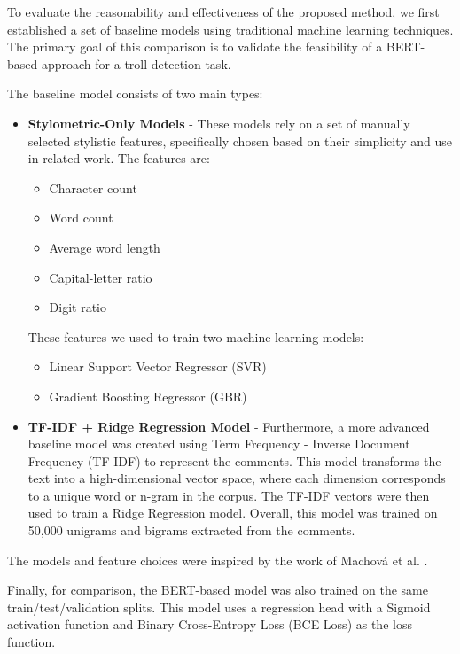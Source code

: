 \documentclass[twoside]{ctuthesis}
\theoremstyle{plain}
\theoremstyle{definition}
\theoremstyle{note}
\begin{document}
To evaluate the reasonability and effectiveness of the proposed method, we first established a set of baseline models using traditional machine learning techniques. The primary goal of this comparison is to validate the feasibility of a BERT-based approach for a troll detection task.\par
The baseline model consists of two main types:
\begin{itemize}
  \item \textbf{Stylometric-Only Models} - These models rely on a set of manually selected stylistic features, specifically chosen based on their simplicity and use in related work. The features are:
  \begin{itemize}
    \item Character count
    \item Word count
    \item Average word length
    \item Capital-letter ratio
    \item Digit ratio
  \end{itemize}
 These features we used to train two machine learning models:
  \begin{itemize}
    \item Linear Support Vector Regressor (SVR)
    \item Gradient Boosting Regressor (GBR)
  \end{itemize}

	\item \textbf{TF-IDF + Ridge Regression Model} - Furthermore, a more advanced baseline model was created using Term Frequency - Inverse Document Frequency (TF-IDF) to represent the comments. This model transforms the text into a high-dimensional vector space, where each dimension corresponds to a unique word or n-gram in the corpus. The TF-IDF vectors were then used to train a Ridge Regression model. Overall, this model was trained on 50,000 unigrams and bigrams extracted from the comments.\par
  \par

\end{itemize}
The models and feature choices were inspired by the work of Machová et al. \cite{Machova2021Algorithms}.\par

Finally, for comparison, the BERT-based model was also trained on the same train/test/validation splits. This model uses a regression head with a Sigmoid activation function and Binary Cross-Entropy Loss (BCE Loss) as the loss function.\par
\end{document}
